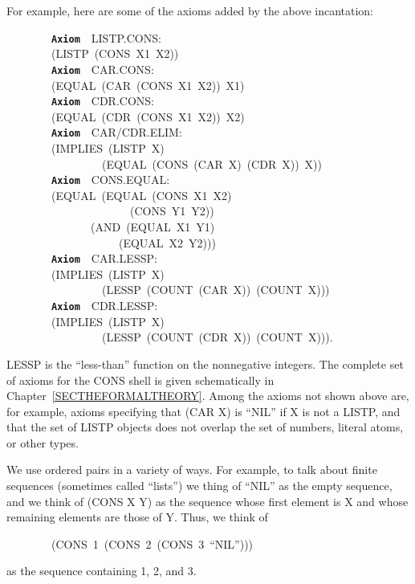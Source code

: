 \documentclass[11pt]{book}
\newenvironment{pubasis}{\begin{flushleft}\ttfamily\small}{\normalsize\rmfamily\end{flushleft}}
\newcommand{\axiomordefinition}[1]{\vspace{6pt}\texttt{\textbf{#1}}}
\begin{document}
For example, here are some of the axioms added by the above
incantation:
\begin{pubasis}
~~~~~~~~\axiomordefinition{Axiom}~~LISTP.CONS:\\
~~~~~~~~(LISTP~(CONS~X1~X2))\\

~~~~~~~~\axiomordefinition{Axiom}~~CAR.CONS:\\
~~~~~~~~(EQUAL~(CAR~(CONS~X1~X2))~X1)\\

~~~~~~~~\axiomordefinition{Axiom}~~CDR.CONS:\\
~~~~~~~~(EQUAL~(CDR~(CONS~X1~X2))~X2)\\

~~~~~~~~\axiomordefinition{Axiom}~~CAR/CDR.ELIM:\\
~~~~~~~~(IMPLIES~(LISTP~X)\\
~~~~~~~~~~~~~~~~~(EQUAL~(CONS~(CAR~X)~(CDR~X))~X))\\

~~~~~~~~\axiomordefinition{Axiom}~~CONS.EQUAL:\\
~~~~~~~~(EQUAL~(EQUAL~(CONS~X1~X2)\\
~~~~~~~~~~~~~~~~~~~~~~(CONS~Y1~Y2))\\
~~~~~~~~~~~~~~~(AND~(EQUAL~X1~Y1)\\
~~~~~~~~~~~~~~~~~~~~(EQUAL~X2~Y2)))\\

~~~~~~~~\axiomordefinition{Axiom}~~CAR.LESSP:\\
~~~~~~~~(IMPLIES~(LISTP~X)\\
~~~~~~~~~~~~~~~~~(LESSP~(COUNT~(CAR~X))~(COUNT~X)))\\

~~~~~~~~\axiomordefinition{Axiom}~~CDR.LESSP:\\
~~~~~~~~(IMPLIES~(LISTP~X)\\
~~~~~~~~~~~~~~~~~(LESSP~(COUNT~(CDR~X))~(COUNT~X))).\\
\end{pubasis}
LESSP is the ``less-than'' function on the nonnegative integers.
The complete set of axioms for the CONS shell is given schematically in Chapter~\ref{SECTHEFORMALTHEORY}.
Among the axioms not shown above are, for example, axioms specifying
that (CAR X) is ``NIL'' if X is not a LISTP, and that the set of LISTP
objects does not overlap the set of numbers, literal atoms, or other
types.

We use ordered pairs in a variety of ways.  For example, to talk
about finite sequences (sometimes called ``lists'') we thing of ``NIL'' as
the empty sequence, and
we think of (CONS X Y) as
the sequence whose first element is X and whose
remaining elements are those of  Y.  Thus, we think of
\begin{pubasis}
~~~~~~~~(CONS~1~(CONS~2~(CONS~3~``NIL'')))\\
\end{pubasis}
as the sequence containing 1, 2, and 3.
\end{document}
